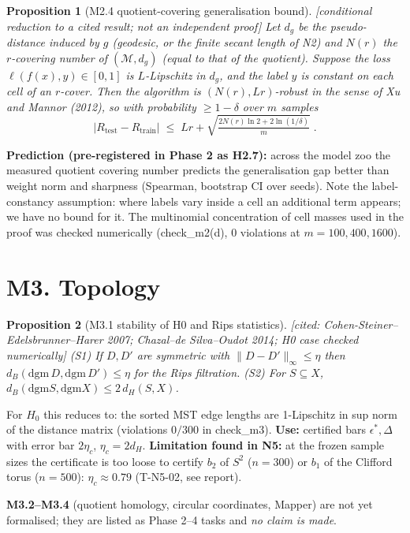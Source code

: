 \documentclass[11pt]{article}
\newtheorem{prop}{Proposition}
\theoremstyle{remark}\newtheorem{rem}{Remark}
\newcommand{\status}[1]{\hfill\textsf{[#1]}}
\begin{document}
\begin{prop}[M2.4 quotient-covering generalisation bound]\status{conditional reduction to a cited result; not an independent proof}
Let $d_g$ be the pseudo-distance induced by $g$ (geodesic, or the finite secant length of N2) and $N(r)$ the $r$-covering number of $(\mathcal M,d_g)$ (equal to that of the quotient). Suppose the loss $\ell(f(x),y)\in[0,1]$ is $L$-Lipschitz in $d_g$, and the label $y$ is constant on each cell of an $r$-cover. Then the algorithm is $(N(r),Lr)$-robust in the sense of Xu and Mannor (2012), so with probability $\ge1-\delta$ over $m$ samples
\[ \bigl|R_{\text{test}}-R_{\text{train}}\bigr|\;\le\;Lr+\sqrt{\tfrac{2N(r)\ln2+2\ln(1/\delta)}{m}}\;. \]
\end{prop}
\textbf{Prediction (pre-registered in Phase 2 as H2.7):} across the model zoo the measured quotient covering number predicts the generalisation gap better than weight norm and sharpness (Spearman, bootstrap CI over seeds). Note the label-constancy assumption: where labels vary inside a cell an additional term appears; we have no bound for it. The multinomial concentration of cell masses used in the proof was checked numerically (check\_m2(d), 0 violations at $m=100,400,1600$).

\section*{M3. Topology}
\begin{prop}[M3.1 stability of H0 and Rips statistics]\status{cited: Cohen-Steiner--Edelsbrunner--Harer 2007; Chazal--de Silva--Oudot 2014; H0 case checked numerically}
(S1) If $D,D'$ are symmetric with $\|D-D'\|_\infty\le\eta$ then $d_B(\mathrm{dgm}\,D,\mathrm{dgm}\,D')\le\eta$ for the Rips filtration. (S2) For $S\subseteq X$, $d_B(\mathrm{dgm}S,\mathrm{dgm}X)\le2\,d_H(S,X)$.
\end{prop}
For $H_0$ this reduces to: the sorted MST edge lengths are 1-Lipschitz in sup norm of the distance matrix (violations $0/300$ in check\_m3). \textbf{Use:} certified bars $\epsilon^*,\Delta$ with error bar $2\eta_c$, $\eta_c=2d_H$. \textbf{Limitation found in N5:} at the frozen sample sizes the certificate is too loose to certify $b_2$ of $S^2$ ($n=300$) or $b_1$ of the Clifford torus ($n=500$): $\eta_c\approx0.79$ (T-N5-02, see report).

\textbf{M3.2--M3.4} (quotient homology, circular coordinates, Mapper) are not yet formalised; they are listed as Phase 2--4 tasks and \emph{no claim is made}.
\end{document}
